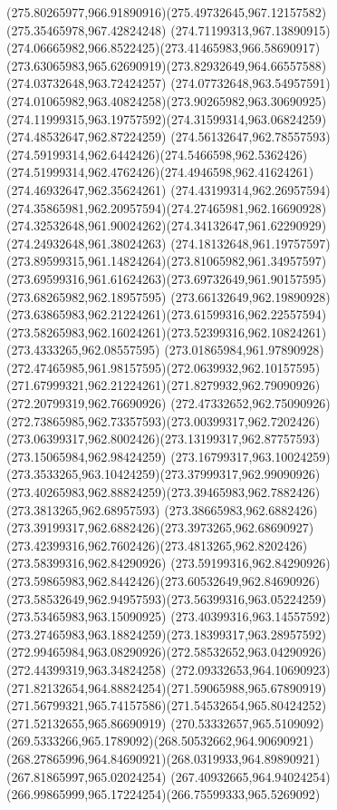 {{\curveto(275.80265977,966.91890916)(275.49732645,967.12157582)(275.35465978,967.42824248)
\curveto(274.71199313,967.13890915)(274.06665982,966.8522425)(273.41465983,966.58690917)
\curveto(273.63065983,965.62690919)(273.82932649,964.66557588)(274.03732648,963.72424257)
\curveto(274.07732648,963.54957591)(274.01065982,963.40824258)(273.90265982,963.30690925)
\curveto(274.11999315,963.19757592)(274.31599314,963.06824259)(274.48532647,962.87224259)
\curveto(274.56132647,962.78557593)(274.59199314,962.6442426)(274.5466598,962.5362426)
\curveto(274.51999314,962.4762426)(274.4946598,962.41624261)(274.46932647,962.35624261)
\curveto(274.43199314,962.26957594)(274.35865981,962.20957594)(274.27465981,962.16690928)
\curveto(274.32532648,961.90024262)(274.34132647,961.62290929)(274.24932648,961.38024263)
\curveto(274.18132648,961.19757597)(273.89599315,961.14824264)(273.81065982,961.34957597)
\curveto(273.69599316,961.61624263)(273.69732649,961.90157595)(273.68265982,962.18957595)
\curveto(273.66132649,962.19890928)(273.63865983,962.21224261)(273.61599316,962.22557594)
\curveto(273.58265983,962.16024261)(273.52399316,962.10824261)(273.4333265,962.08557595)
\curveto(273.01865984,961.97890928)(272.47465985,961.98157595)(272.0639932,962.10157595)
\curveto(271.67999321,962.21224261)(271.8279932,962.79090926)(272.20799319,962.76690926)
\curveto(272.47332652,962.75090926)(272.73865985,962.73357593)(273.00399317,962.7202426)
\curveto(273.06399317,962.8002426)(273.13199317,962.87757593)(273.15065984,962.98424259)
\curveto(273.16799317,963.10024259)(273.3533265,963.10424259)(273.37999317,962.99090926)
\curveto(273.40265983,962.88824259)(273.39465983,962.7882426)(273.3813265,962.68957593)
\curveto(273.38665983,962.6882426)(273.39199317,962.6882426)(273.3973265,962.68690927)
\curveto(273.42399316,962.7602426)(273.4813265,962.8202426)(273.58399316,962.84290926)
\curveto(273.59199316,962.84290926)(273.59865983,962.8442426)(273.60532649,962.84690926)
\curveto(273.58532649,962.94957593)(273.56399316,963.05224259)(273.53465983,963.15090925)
\curveto(273.40399316,963.14557592)(273.27465983,963.18824259)(273.18399317,963.28957592)
\curveto(272.99465984,963.08290926)(272.58532652,963.04290926)(272.44399319,963.34824258)
\curveto(272.09332653,964.10690923)(271.82132654,964.88824254)(271.59065988,965.67890919)
\curveto(271.56799321,965.74157586)(271.54532654,965.80424252)(271.52132655,965.86690919)
\curveto(270.53332657,965.5109092)(269.5333266,965.1789092)(268.50532662,964.90690921)
\curveto(268.27865996,964.84690921)(268.0319933,964.89890921)(267.81865997,965.02024254)
\curveto(267.40932665,964.94024254)(266.99865999,965.17224254)(266.75599333,965.5269092)
}}
